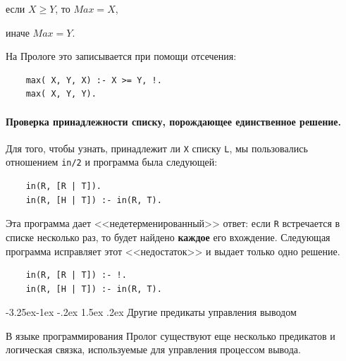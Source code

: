 \documentclass[12pt, openany, twoside]{book} %
\makeatletter
\renewcommand\subsection{\@startsection{subsection}{2}{\z@}%
                                     {-3.25ex\@plus -1ex \@minus -.2ex}%
                                     {1.5ex \@plus .2ex}%
                                     {\normalfont\normalsize\bfseries}}
\makeatother
\begin{document}
если $X \geq Y$, то $Max = X$,

иначе $Max = Y$.

На Прологе это записывается при помощи отсечения:
{\tt \begin{verbatim}
    max( X, Y, X) :- X >= Y, !.
    max( X, Y, Y).
\end{verbatim}}

\paragraph{Проверка принадлежности списку, порождающее един\-ствен\-ное
решение.} Для того, чтобы узнать, принадлежит ли {\tt X} списку {\tt L}, мы пользовались отношением {\tt in/2} и программа была следующей:
{\tt \begin{verbatim}
    in(R, [R | Т]).
    in(R, [H | Т]) :- in(R, T).
\end{verbatim}}

\noindent Эта программа дает <<недетерменированный>> ответ: если {\tt R} встречается в списке несколько раз, то будет найдено {\bf каждое} его вхождение. Следующая программа исправляет этот <<недостаток>> и выдает только одно решение.
{\tt \begin{verbatim}
    in(R, [R | Т]) :- !.
    in(R, [H | Т]) :- in(R, T).
\end{verbatim}}

\subsection{Другие предикаты управления выводом}

В языке программирования Пролог существуют еще несколько предикатов и логическая связка, используемые для управления процессом вывода.
\end{document}
